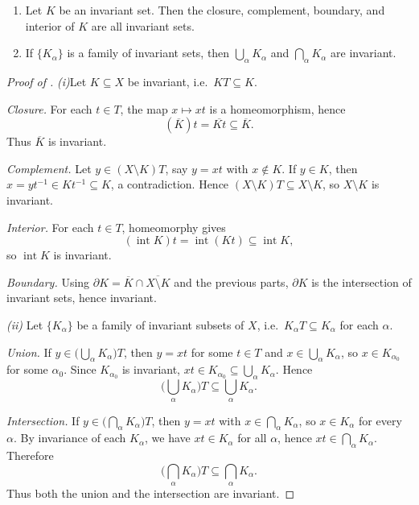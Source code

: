 \begin{proposition}
    \begin{enumerate}
        \item Let $K$ be an invariant set. Then the closure, complement, boundary, and interior of $K$ are all invariant sets.
        \item If $\{K_\alpha\}$ is a family of invariant sets, then $\bigcup_\alpha K_\alpha$ and $\bigcap_\alpha K_\alpha$ are invariant.
    \end{enumerate}
\end{proposition}

\begin{proof}[Proof of ]
    \textit{(i)}Let $K\subseteq X$ be invariant, i.e.\ $K T\subseteq K$.

    \emph{Closure.} For each $t\in T$, the map $x\mapsto xt$ is a homeomorphism, hence
    \[
        (\overline{K})t=\overline{Kt}\subseteq \overline{K}.
    \]
    Thus $\overline{K}$ is invariant.

    \emph{Complement.} Let $y\in (X\setminus K)T$, say $y=xt$ with $x\notin K$. If $y\in K$, then
    $x= y t^{-1}\in Kt^{-1}\subseteq K$, a contradiction. Hence $(X\setminus K)T\subseteq X\setminus K$,
    so $X\setminus K$ is invariant.

    \emph{Interior.} For each $t\in T$, homeomorphy gives
    \[
        (\operatorname{int}K)t=\operatorname{int}(Kt)\subseteq \operatorname{int}K,
    \]
    so $\operatorname{int}K$ is invariant.

    \emph{Boundary.} Using $\partial K=\overline{K}\cap\overline{X\setminus K}$ and the previous parts,
    $\partial K$ is the intersection of invariant sets, hence invariant.

    \textit{(ii)}
    Let $\{K_\alpha\}$ be a family of invariant subsets of $X$, i.e.\ $K_\alpha T\subseteq K_\alpha$ for each $\alpha$.

    \emph{Union.} If $y\in\bigl(\bigcup_\alpha K_\alpha\bigr)T$, then $y=xt$ for some $t\in T$ and
    $x\in\bigcup_\alpha K_\alpha$, so $x\in K_{\alpha_0}$ for some $\alpha_0$. Since $K_{\alpha_0}$ is invariant,
    $xt\in K_{\alpha_0}\subseteq\bigcup_\alpha K_\alpha$. Hence
    \[
        \bigl(\bigcup_\alpha K_\alpha\bigr)T\subseteq\bigcup_\alpha K_\alpha.
    \]

    \emph{Intersection.} If $y\in\bigl(\bigcap_\alpha K_\alpha\bigr)T$, then $y=xt$ with $x\in\bigcap_\alpha K_\alpha$,
    so $x\in K_\alpha$ for every $\alpha$. By invariance of each $K_\alpha$, we have $xt\in K_\alpha$ for all $\alpha$,
    hence $xt\in\bigcap_\alpha K_\alpha$. Therefore
    \[
        \bigl(\bigcap_\alpha K_\alpha\bigr)T\subseteq\bigcap_\alpha K_\alpha.
    \]
    Thus both the union and the intersection are invariant.
\end{proof}


